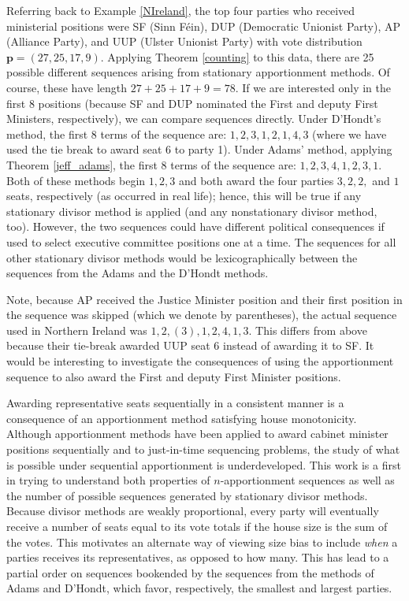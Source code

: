 \documentclass[pdflatex,sn-mathphys-num]{sn-jnl}
\theoremstyle{thmstyleone}%
\theoremstyle{thmstyletwo}%
\theoremstyle{thmstylethree}%
\begin{document}
Referring back to Example \ref{NIreland},  the top four parties who received ministerial positions were SF (Sinn F\' ein), DUP (Democratic Unionist Party), AP (Alliance Party), and UUP (Ulster Unionist Party) with vote distribution $\mathbf p = (27, 25, 17, 9)$. Applying Theorem  \ref{counting} to this data,
 there are  25 possible different sequences arising from stationary apportionment methods. Of course, these have length $27+25+17+9= 78$. If we are interested only in the first 8 positions (because SF and DUP nominated the First and deputy First Ministers, respectively), we can compare sequences directly.  Under D'Hondt's method, the first 8 terms of the sequence are:   $1, 2, 3, 1, 2, 1, 4, 3$ (where we have used the tie break to award seat 6 to party 1).  Under Adams' method, applying Theorem \ref{jeff_adams},  the first 8 terms of the sequence are:   $1, 2, 3, 4, 1, 2, 3, 1$. Both of these methods begin $1, 2, 3$ and both award the four parties $3, 2, 2,$ and $1$ seats, respectively (as occurred in real life); hence, this will be true if any stationary divisor method is applied (and any nonstationary divisor method, too). However, the two sequences could have different political consequences if used to select executive committee positions one at a time.  The sequences for all other stationary divisor methods would be lexicographically between the sequences from the Adams and the D'Hondt methods.
 
 Note, because AP received the Justice Minister position and their first position in the sequence was skipped (which we denote by parentheses), the actual sequence used in Northern Ireland was $1, 2, (3), 1, 2, 4, 1, 3$.  This differs from above because their tie-break awarded UUP seat 6 instead of awarding it to SF.  It would be interesting to investigate the consequences of using the apportionment sequence to also award the First and deputy First Minister positions.


Awarding representative seats sequentially in a consistent manner is a consequence of an apportionment method satisfying house monotonicity. Although apportionment methods have been applied to award cabinet minister positions sequentially and to just-in-time sequencing problems, the study of what is possible under sequential apportionment is underdeveloped.  This work is a first in trying to understand both properties of $n$-apportionment sequences as well as the number of possible sequences generated by stationary divisor methods.  Because divisor methods are weakly proportional, every party will eventually receive a number of seats equal to its vote totals if the house size is the sum of the votes.  This motivates an alternate way of viewing size bias to include {\it when} a parties receives its representatives, as opposed to how many.  This has lead to a partial order on sequences bookended by the sequences from the methods of Adams and D'Hondt, which favor, respectively, the smallest and largest parties. 
\end{document}
